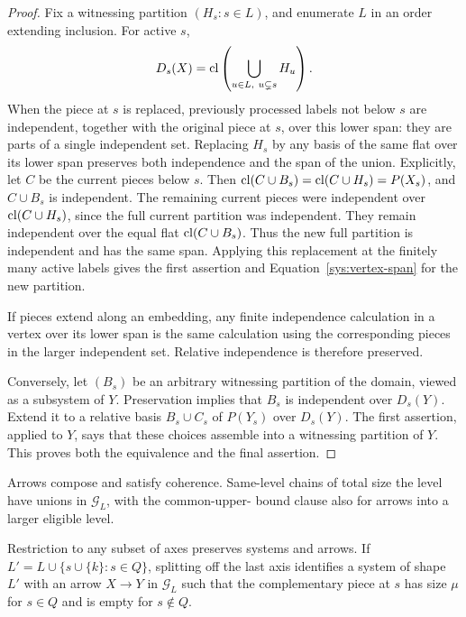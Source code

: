 \begin{proof}
Fix a witnessing partition $(H_s:s\in L)$, and enumerate $L$ in an
order extending inclusion.  For active $s$,
\[
 D_s(X)=\cl\left(\bigcup_{u\in L,\ u\subsetneq s}H_u\right).
\]
When the piece at $s$ is replaced, previously processed labels not
below $s$ are independent, together with the original piece at $s$,
over this lower span: they are parts of a single independent set.
Replacing $H_s$ by any basis of the same flat over its lower span
preserves both independence and the span of the union.  Explicitly,
let $C$ be the current pieces below $s$.  Then
$\operatorname{cl}(C\cup B_s)=\operatorname{cl}(C\cup H_s)=P(X_s)$, and $C\cup B_s$ is
independent.  The remaining current pieces were independent over
$\operatorname{cl}(C\cup H_s)$, since the full current partition was independent.
They remain independent over the equal flat $\operatorname{cl}(C\cup B_s)$.
Thus the new full partition is independent and has the same span.
Applying this replacement at the finitely many active labels gives the
first assertion and Equation~\eqref{sys:vertex-span} for the new
partition.

If pieces extend along an embedding, any finite independence
calculation in a vertex over its lower span is the same calculation
using the corresponding pieces in the larger independent set.
Relative independence is therefore preserved.

Conversely, let $(B_s)$ be an arbitrary witnessing partition of the
domain, viewed as a subsystem of $Y$.  Preservation implies that
$B_s$ is independent over $D_s(Y)$.  Extend it to a relative basis
$B_s\cup C_s$ of $P(Y_s)$ over $D_s(Y)$.  The first assertion, applied
to $Y$, says that these choices assemble into a witnessing partition
of $Y$.  This proves both the equivalence and the final assertion.
\end{proof}

\begin{lemma}
\label{sys:structural}
Arrows compose and satisfy coherence.  Same-level chains of total
size the level have unions in $\mathcal G_L$, with the common-upper-
bound clause also for arrows into a larger eligible level.

Restriction to any subset of axes preserves systems and arrows.
If $L'=L\cup\{s\cup\{k\}:s\in Q\}$, splitting off the last axis
identifies a system of shape $L'$ with an arrow $X\to Y$ in
$\mathcal G_L$ such that the complementary piece at $s$ has size
$\mu$ for $s\in Q$ and is empty for $s\notin Q$.
\end{lemma}

